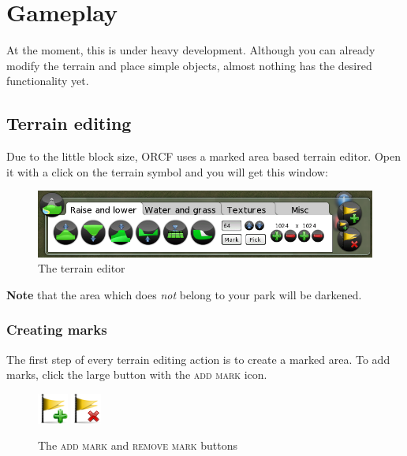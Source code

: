 \documentclass[a4paper]{article}
\newcommand{\ccaption}[1]{\textsc{#1}}
\newcommand{\note}[1]{\textbf{Note} #1 \par}
\begin{document}
\section{Gameplay}
At the moment, this is under heavy development. Although you can already modify the terrain and place simple objects, almost nothing
has the desired functionality yet.

\subsection{Terrain editing}
Due to the little block size, ORCF uses a marked area based terrain editor. Open it with a click on the terrain symbol and you will get
this window:

\begin{figure}[h]
  \begin{center}
    \includegraphics[width=140mm]{./images/terrain-01.png}
  \end{center}
  \caption{The terrain editor}
\end{figure}

\note{that the area which does \emph{not} belong to your park will be darkened.}

\subsubsection{Creating marks}
The first step of every terrain editing action is to create a marked area. To add marks, click the large button with the \ccaption{add mark} icon.

\begin{figure}[h]
  \begin{center}
    \includegraphics[width=10mm]{../images/selection-add.png}
    \includegraphics[width=10mm]{../images/selection-delete.png}
  \end{center}
  \caption{The \ccaption{add mark} and \ccaption{remove mark} buttons}
\end{figure}
\end{document}
